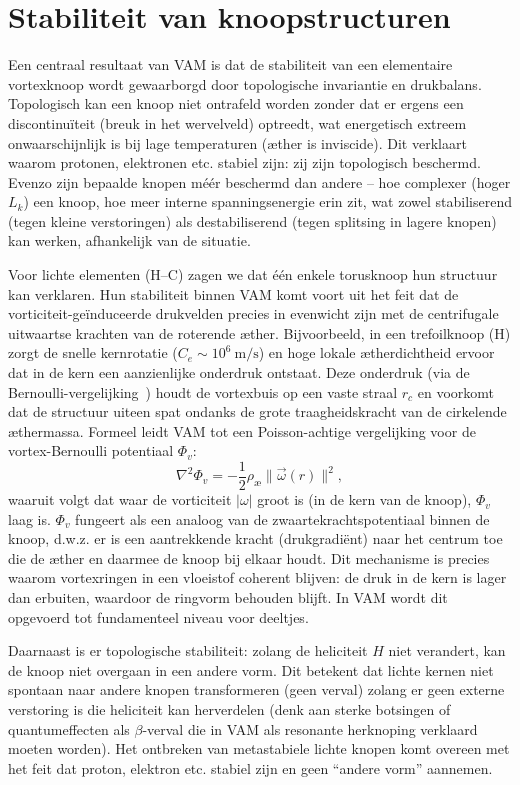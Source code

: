 \section{Stabiliteit van knoopstructuren}

Een centraal resultaat van VAM is dat de stabiliteit van een elementaire vortexknoop wordt gewaarborgd door topologische invariantie en drukbalans. Topologisch kan een knoop niet ontrafeld worden zonder dat er ergens een discontinuïteit (breuk in het wervelveld) optreedt, wat energetisch extreem onwaarschijnlijk is bij lage temperaturen (æther is inviscide). Dit verklaart waarom protonen, elektronen etc. stabiel zijn: zij zijn topologisch beschermd. Evenzo zijn bepaalde knopen méér beschermd dan andere – hoe complexer (hoger $L_k$) een knoop, hoe meer interne spanningsenergie erin zit, wat zowel stabiliserend (tegen kleine verstoringen) als destabiliserend (tegen splitsing in lagere knopen) kan werken, afhankelijk van de situatie.

Voor lichte elementen (H–C) zagen we dat één enkele torusknoop hun structuur kan verklaren. Hun stabiliteit binnen VAM komt voort uit het feit dat
de vorticiteit-geïnduceerde drukvelden precies in evenwicht zijn met de centrifugale uitwaartse krachten van de roterende æther. Bijvoorbeeld, in een trefoilknoop (H) zorgt de snelle kernrotatie ($C_e \sim10^6~\text{m/s}$) en hoge lokale ætherdichtheid ervoor dat in de kern een aanzienlijke onderdruk ontstaat. Deze onderdruk (via de Bernoulli-vergelijking~\cite{Ricca1992EnergyHelicity}) houdt de vortexbuis op een vaste straal $r_c$ en voorkomt dat de structuur uiteen spat ondanks de grote traagheidskracht van de cirkelende æthermassa. Formeel leidt VAM tot een Poisson-achtige vergelijking voor de vortex-Bernoulli potentiaal $\Phi_v$:
\begin{equation}
    \nabla^2 \Phi_v = -\frac{1}{2}\rho_\text{\ae} \| \vec{\omega}(r) \|^2,
\end{equation}
waaruit volgt dat waar de vorticiteit $|\omega|$ groot is (in de kern van de knoop), $\Phi_v$ laag is. $\Phi_v$ fungeert als een analoog van de zwaartekrachtspotentiaal binnen de knoop, d.w.z. er is een aantrekkende kracht (drukgradiënt) naar het centrum toe die de æther en daarmee de knoop bij elkaar houdt. Dit mechanisme is precies waarom vortexringen in een vloeistof coherent blijven: de druk in de kern is lager dan erbuiten, waardoor de ringvorm behouden blijft. In VAM wordt dit opgevoerd tot fundamenteel niveau voor deeltjes.

Daarnaast is er topologische stabiliteit: zolang de heliciteit $H$ niet verandert, kan de knoop niet overgaan in een andere vorm. Dit betekent dat lichte kernen niet spontaan naar andere knopen transformeren (geen verval) zolang er geen externe verstoring is die heliciteit kan herverdelen (denk aan sterke botsingen of quantumeffecten als $\beta$-verval die in VAM als resonante herknoping verklaard moeten worden). Het ontbreken van metastabiele lichte knopen komt overeen met het feit dat proton, elektron etc. stabiel zijn en geen “andere vorm” aannemen.